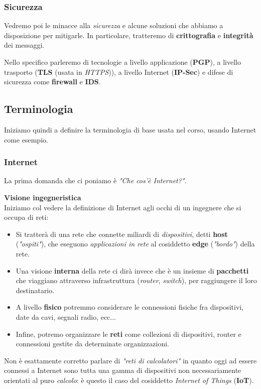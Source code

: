 \documentclass[a4paper,11pt]{article}
\begin{document}
\subsubsection{Sicurezza}
Vedremo poi le minacce alla \textit{sicurezza} e alcune soluzioni che abbiamo a disposizione per mitigarle.
In particolare, tratteremo di \textbf{crittografia} e \textbf{integrità} dei messaggi. 

Nello specifico parleremo di tecnologie a livello applicazione (\textbf{PGP}), a livello trasporto (\textbf{TLS} (usata in \textit{HTTPS})), a livello Internet (\textbf{IP-Sec}) e difese di sicurezza come \textbf{firewall} e \textbf{IDS}.

\subsection{Terminologia}
Iniziamo quindi a definire la terminologia di base usata nel corso, usando Internet come esempio.

\subsubsection{Internet}
La prima domanda che ci poniamo è \textit{"Che cos'è Internet?"}.

\par\medskip
\textbf{\textsf{Visione ingegneristica}} \\
\noindent
Iniziamo col vedere la definizione di Internet agli occhi di un ingegnere che si occupa di reti: 
\begin{itemize}
	\item Si tratterà di una rete che connette miliardi di \textit{dispositivi}, detti \textbf{host} (\textit{"ospiti"}), che eseguono \textit{applicazioni in rete} al cosiddetto \textbf{edge} (\textit{"bordo"}) della rete.
	\item Una visione \textbf{interna} della rete ci dirà invece che è un insieme di \textbf{pacchetti} che viaggiano attraverso infrastruttura (\textit{router}, \textit{switch}), per raggiungere il loro destinatario.
	\item A livello \textbf{fisico} potremmo considerare le connessioni fisiche fra dispositivi, date da cavi, segnali radio, ecc...
	\item Infine, potremo organizzare le \textbf{reti} come collezioni di dispositivi, router e connessioni gestite da determinate organizzazioni.
\end{itemize}

Non è esattamente corretto parlare di \textit{"reti di calcolatori"} in quanto oggi ad essere connessi a Internet sono tutta una gamma di dispositivi non necessariamente orientati al puro \textit{calcolo}: è questo il caso del cosiddetto \textit{Internet of Things} (\textbf{IoT}).
\end{document}
